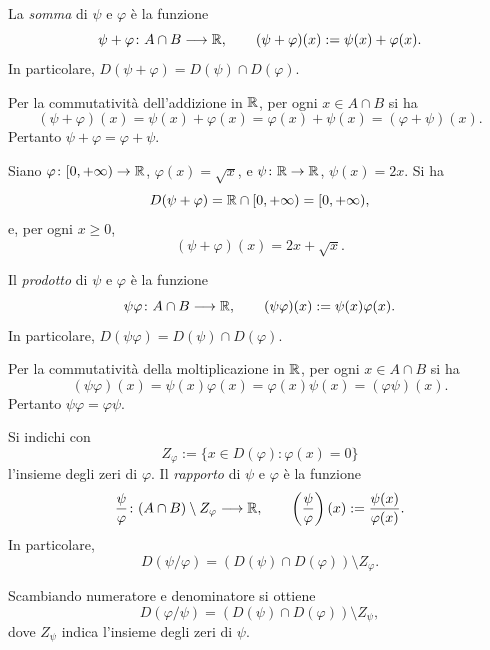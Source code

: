 \begin{definition}
\label{def:lez07-somma}
La \emph{somma} di \(\psi\) e \(\varphi\)
è la funzione
\[
  \psi+\varphi\colon A\cap B\longrightarrow\mathbb{R},
  \qquad
  (\psi+\varphi)(x):=\psi(x)+\varphi(x).
\]
In particolare,
\(D(\psi+\varphi)=D(\psi)\cap D(\varphi)\).
\end{definition}

Per la commutatività dell'addizione in \(\mathbb{R}\),
per ogni \(x\in A\cap B\) si ha
\[
  (\psi+\varphi)(x)=\psi(x)+\varphi(x)
  =\varphi(x)+\psi(x)=(\varphi+\psi)(x).
\]
Pertanto \(\psi+\varphi=\varphi+\psi\).

\begin{example}
\label{ex:lez07-somma-radice}
Siano \(\varphi\colon[0,+\infty)\to\mathbb{R}\),
\(\varphi(x)=\sqrt{x}\), e
\(\psi\colon\mathbb{R}\to\mathbb{R}\), \(\psi(x)=2x\). Si ha
\[
  D(\psi+\varphi)
  =\mathbb{R}\cap[0,+\infty)
  =[0,+\infty),
\]
e, per ogni \(x\ge0\),
\[
  (\psi+\varphi)(x)=2x+\sqrt{x}.
\]
\end{example}

\begin{definition}
\label{def:lez07-prodotto}
Il \emph{prodotto} di \(\psi\) e \(\varphi\)
è la funzione
\[
  \psi\varphi\colon A\cap B\longrightarrow\mathbb{R},
  \qquad
  (\psi\varphi)(x):=\psi(x)\varphi(x).
\]
In particolare,
\(D(\psi\varphi)=D(\psi)\cap D(\varphi)\).
\end{definition}

Per la commutatività della moltiplicazione in \(\mathbb{R}\),
per ogni \(x\in A\cap B\) si ha
\[
  (\psi\varphi)(x)=\psi(x)\varphi(x)
  =\varphi(x)\psi(x)=(\varphi\psi)(x).
\]
Pertanto \(\psi\varphi=\varphi\psi\).

\begin{definition}
\label{def:lez07-quoziente}
Si indichi con
\[
  Z_\varphi:=\{x\in D(\varphi):\varphi(x)=0\}
\]
l'insieme degli zeri di \(\varphi\).
Il \emph{rapporto} di \(\psi\) e \(\varphi\)
è la funzione
\[
  \frac{\psi}{\varphi}\colon
  (A\cap B)\setminus Z_\varphi
  \longrightarrow\mathbb{R},
  \qquad
  \left(\frac{\psi}{\varphi}\right)(x)
  :=\frac{\psi(x)}{\varphi(x)}.
\]
In particolare,
\[
  D(\psi/\varphi)
  =(D(\psi)\cap D(\varphi))\setminus Z_\varphi.
\]
\end{definition}

Scambiando numeratore e denominatore si ottiene
\[
  D(\varphi/\psi)
  =(D(\psi)\cap D(\varphi))\setminus Z_\psi,
\]
dove \(Z_\psi\) indica l'insieme degli zeri
di \(\psi\).

